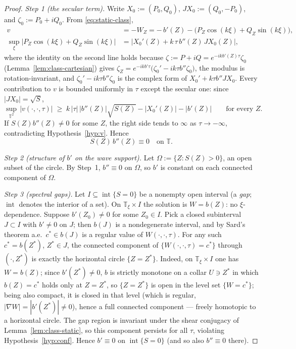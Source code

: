 \documentclass[11pt]{amsart}
\theoremstyle{definition}
\theoremstyle{remark}
\newcommand{\T}{\mathbb{T}}
\DeclareMathOperator{\intr}{int}
\begin{document}
\begin{proof}
\emph{Step 1 (the secular term).} Write $X_0:=(P_0,Q_0)$,
$JX_0:=(Q_0,-P_0)$, and $\zeta_0:=P_0+iQ_0$. From
\eqref{eq:static-class},
\begin{equation}\label{eq:v-static}
\begin{aligned}
  v&=-W_Z=-\,b'(Z)-\bigl(P_Z\cos(k\xi)+Q_Z\sin(k\xi)\bigr),\\
  \sup_\xi\bigl|P_Z\cos(k\xi)+Q_Z\sin(k\xi)\bigr|
  &=\bigl|X_0'(Z)+k\,\tau\,b''(Z)\,JX_0(Z)\bigr|,
\end{aligned}
\end{equation}
where the identity on the second line holds because
$\zeta:=P+iQ=e^{-ik b'(Z)\tau}\zeta_0$
(Lemma~\ref{lem:class-cartesian}) gives
$\zeta_Z=e^{-ik b'\tau}\bigl(\zeta_0'-ik\tau b''\zeta_0\bigr)$, the
modulus is rotation-invariant, and $\zeta_0'-ik\tau b''\zeta_0$ is the
complex form of $X_0'+k\tau b''JX_0$. Every contribution to $v$ is
bounded uniformly in $\tau$ except the secular one: since
$|JX_0|=\sqrt S$,
\[
  \sup_{\T^2}\,|v(\cdot,\cdot,\tau)|
  \;\ge\;k\,|\tau|\,|b''(Z)|\sqrt{S(Z)}-|X_0'(Z)|-|b'(Z)|
  \qquad\text{for every }Z .
\]
If $S(Z)b''(Z)\neq0$ for some $Z$, the right side tends to $\infty$ as
$\tau\to-\infty$, contradicting Hypothesis~\ref{hyp:v}. Hence
\[
  S(Z)\,b''(Z)\equiv0\quad\text{on }\T .
\]

\emph{Step 2 (structure of $b'$ on the wave support).} Let
$\Omega:=\{Z:S(Z)>0\}$, an open subset of the circle. By Step~1,
$b''\equiv0$ on $\Omega$, so $b'$ is constant on each connected
component of $\Omega$.

\emph{Step 3 (spectral gaps).} Let $I\subseteq\intr\{S=0\}$ be a
nonempty open interval (a \emph{gap}; $\intr$ denotes the interior of a
set). On $\T_\xi\times I$ the solution is $W=b(Z)$: no
$\xi$-dependence. Suppose $b'(Z_0)\neq0$ for some $Z_0\in I$.
Pick a closed subinterval $J\subset I$ with $b'\neq0$ on $J$; then
$b(J)$ is a nondegenerate interval, and by Sard's theorem a.e.\
$c^*\in b(J)$ is a regular value of $W(\cdot,\cdot,\tau)$. For any such
$c^*=b(Z^*)$, $Z^*\in J$, the connected component of
$\{W(\cdot,\cdot,\tau)=c^*\}$ through $(\cdot,Z^*)$ is exactly the
horizontal circle $\{Z=Z^*\}$. Indeed, on $\T_\xi\times I$ one has
$W=b(Z)$; since $b'(Z^*)\neq0$, $b$ is strictly monotone on a collar
$U\ni Z^*$ in which $b(Z)=c^*$ holds only at $Z=Z^*$, so $\{Z=Z^*\}$ is
open in the level set $\{W=c^*\}$; being also compact, it is closed in
that level (which is regular, $|\nabla W|=|b'(Z^*)|\neq0$), hence a full
connected component --- freely homotopic to a horizontal circle. The gap region is invariant under the
shear conjugacy of Lemma~\ref{lem:class-static}, so this component
persists for all $\tau$, violating Hypothesis~\ref{hyp:conf}. Hence
$b'\equiv0$ on $\intr\{S=0\}$ (and so also $b''\equiv0$ there).


\end{proof}
\end{document}
